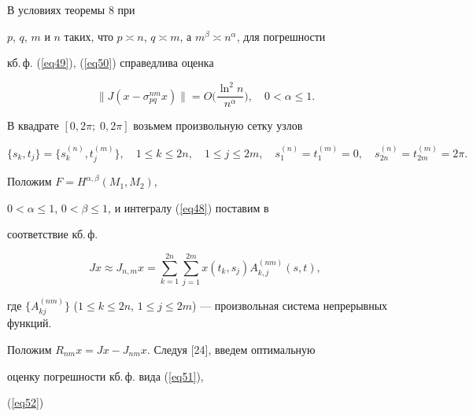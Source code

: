\begin{cor}


В условиях теоремы 8 при


$p$, $q$, $m$ и $n$ таких, что $p\asymp n$, $q\asymp


m$, а $m^\beta\asymp n^\alpha$, для погрешности 


кб.\,ф. (\ref{eq49}), (\ref{eq50}) справедлива оценка


$$


\|J(x-\sigma_{pq}^{nm}x)\| =


O\bigg(\frac{\ln^2n}{n^\alpha}\bigg),\quad0<\alpha\leq1.


$$


\end{cor}





В квадрате $[0,2\pi;\; 0,2\pi]$ возьмем произвольную сетку узлов


\begin{equation}\label{eq51}


\{s_k,t_j\} = \{s_k^{(n)},t_j^{(m)}\},


\quad1\leq k\leq2n,\quad1\leq j\leq2m,\quad s_1^{(n)} = t_1^{(m)}


= 0,\quad s_{2n}^{(n)} = t_{2m}^{(m)} = 2\pi.


\end{equation}


Положим $F=H^{\alpha,\beta}(M_1,M_2)$,


$0<\alpha\leq1$, $0<\beta\leq1$, и интегралу (\ref{eq48}) поставим в


соответствие кб.\,ф.


\begin{equation}\label{eq52}


Jx\approx J_{n,m}x = \sum_{k=1}^{2n} \sum_{j=1}^{2m}


x(t_k,s_j)A_{k,j}^{(nm)}(s,t),


\end{equation}


где $\{A_{kj}^{(nm)}\}$ ($1\leq k\leq2n$, $1\leq


j\leq2m$) --- произвольная система непрерывных функций.





Положим $R_{nm}x=Jx-J_{nm}x$. Следуя [24], введем оптимальную


оценку погрешности кб.\,ф. вида (\ref{eq51}),


(\ref{eq52})


